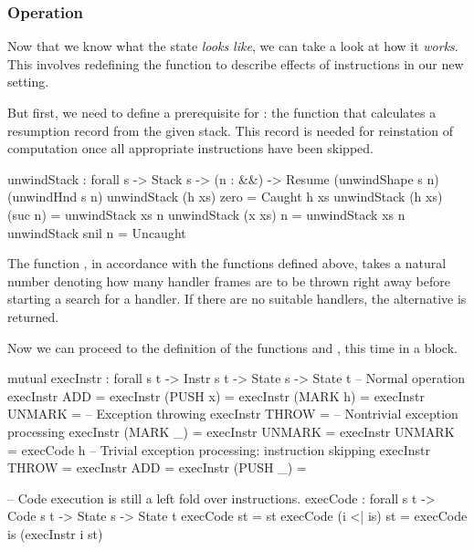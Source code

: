 \subsubsection{Operation}

Now that we know what the state \emph{looks like}, we can take a look at how it \emph{works}.
This involves redefining the function  to describe effects of instructions
in our new setting.

But first, we need to define a prerequisite for : the function
 that calculates a resumption record from the given stack. This record
is needed for reinstation of computation once all appropriate instructions have been skipped.

\label{sec:ham-unwindStack}\begin{code}
  unwindStack : forall {s} -> Stack s -> (n : \bN&\!&)
    -> Resume (unwindShape s n) (unwindHnd s n)
  unwindStack (h \sconsh xs) zero = Caught h xs
  unwindStack (h \sconsh xs) (suc n) = unwindStack xs n
  unwindStack (x \scons xs) n = unwindStack xs n
  unwindStack snil n = Uncaught
\end{code}

\noindent The function , in accordance with the functions
defined above, takes a natural number  denoting how many handler
frames are to be thrown right away before starting a search for a handler.  If
there are no suitable handlers, the alternative  is returned.

Now we can proceed to the definition of the functions  and
, this time in a  block.

\begin{codei}
  mutual
    execInstr : forall {s t} -> Instr s t -> State s -> State t
  	-- Normal operation
    execInstr ADD 				= \tick[ (x + y) \scons st ]
    execInstr (PUSH x)		\tick[ st ] 		= \tick[ x \scons st ]
    execInstr (MARK h)		\tick[ st ] 		= \tick[ h \sconsh st ]
    execInstr UNMARK			= \tick[ x \scons st ]
    -- Exception throwing  
    execInstr THROW			\tick[ st ] =  
    -- Nontrivial exception processing
    execInstr (MARK _)		\x[ n	 ,	r	] = \x[ suc n, r ]
    execInstr UNMARK		\x[ suc n ,	r	] = \x[ n	, r ]
    execInstr UNMARK		 = execCode h \tick[ st ]
    -- Trivial exception processing: instruction skipping
    execInstr THROW			\x[ n , r ] = \x[ n , r ]
    execInstr ADD			\x[ n , r ] = \x[ n , r ]
    execInstr (PUSH _)		\x[ n , r ] = \x[ n , r ]
\end{codei}
\begin{code}
    -- Code execution is still a left fold over instructions.
    execCode : forall {s t} -> Code s t -> State s -> State t
    execCode \nil st = st
    execCode (i <| is) st = execCode is (execInstr i st)
\end{code}

